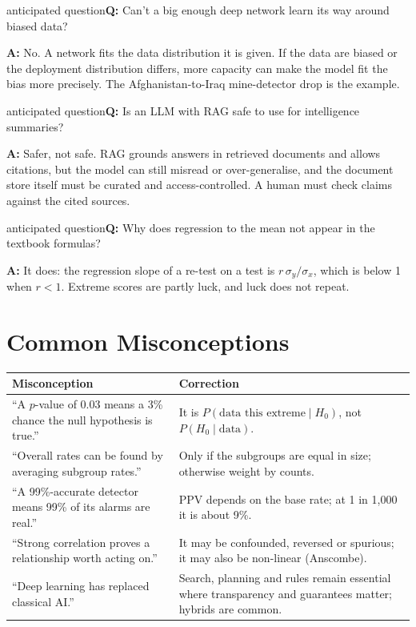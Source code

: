 \documentclass[11pt]{article}
\begin{document}
\begin{question}{anticipated question}\textbf{Q:} Can't a big enough deep network learn its way around biased data?\par\smallskip\textbf{A:} No. A network fits the data distribution it is given. If the data are biased or the deployment distribution differs, more capacity can make the model fit the bias more precisely. The Afghanistan-to-Iraq mine-detector drop is the example.\end{question}

\begin{question}{anticipated question}\textbf{Q:} Is an LLM with RAG safe to use for intelligence summaries?\par\smallskip\textbf{A:} Safer, not safe. RAG grounds answers in retrieved documents and allows citations, but the model can still misread or over-generalise, and the document store itself must be curated and access-controlled. A human must check claims against the cited sources.\end{question}

\begin{question}{anticipated question}\textbf{Q:} Why does regression to the mean not appear in the textbook formulas?\par\smallskip\textbf{A:} It does: the regression slope of a re-test on a test is $r\,\sigma_y/\sigma_x$, which is below 1 when $r<1$. Extreme scores are partly luck, and luck does not repeat.\end{question}

\section{Common Misconceptions}\begin{center}\small\renewcommand{\arraystretch}{1.35}\begin{tabularx}{\textwidth}{@{}>{\raggedright\arraybackslash}X >{\raggedright\arraybackslash}X@{}}\toprule\textbf{Misconception} & \textbf{Correction}\\\midrule``A $p$-value of 0.03 means a 3\% chance the null hypothesis is true.'' & It is $P(\text{data this extreme}\mid H_0)$, not $P(H_0\mid\text{data})$.\\
``Overall rates can be found by averaging subgroup rates.'' & Only if the subgroups are equal in size; otherwise weight by counts.\\
``A 99\%-accurate detector means 99\% of its alarms are real.'' & PPV depends on the base rate; at 1 in 1,000 it is about 9\%.\\
``Strong correlation proves a relationship worth acting on.'' & It may be confounded, reversed or spurious; it may also be non-linear (Anscombe).\\
``Deep learning has replaced classical AI.'' & Search, planning and rules remain essential where transparency and guarantees matter; hybrids are common.\\\bottomrule\end{tabularx}\end{center}
\end{document}
